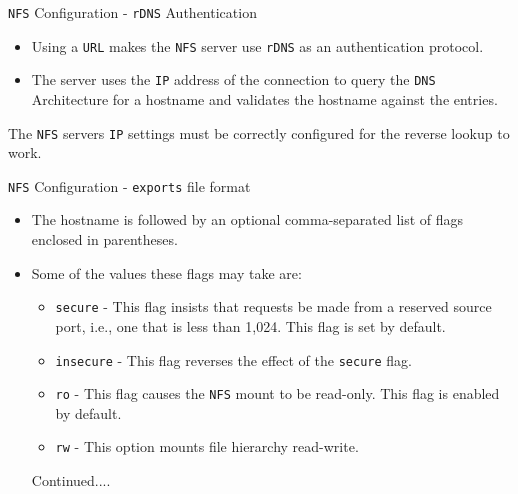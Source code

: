\documentclass[xcolor=table]{beamer}
\begin{document}
\begin{frame}{\texttt{NFS} Configuration - \texttt{rDNS} Authentication}
  \begin{itemize}
    \item Using a \texttt{URL} makes the \texttt{NFS} server use \texttt{rDNS} as an authentication protocol.
    \item The server uses the \texttt{IP} address of the connection to query the \texttt{DNS} Architecture for a hostname and validates the hostname against the entries.
  \end{itemize}
  \begin{tcolorbox}
    \begin{center}
      \scriptsize The \texttt{NFS} servers \texttt{IP} settings must be correctly configured for the reverse lookup to work.
    \end{center}
  \end{tcolorbox}
\end{frame}

\begin{frame}{\texttt{NFS} Configuration - \texttt{exports} file format}
  \begin{itemize}
    \item The hostname is followed by an optional comma-separated list of flags enclosed in parentheses. 
    \item Some of the values these flags may take are: 
      \begin{itemize}
        \item \texttt{secure} - This flag insists that requests be made from a reserved source port, i.e., one that is less than 1,024. This flag is set by default.
        \item \texttt{insecure} - This flag reverses the effect of the \texttt{secure} flag.
        \item \texttt{ro} - This flag causes the \texttt{NFS} mount to be read-only. This flag is enabled by default.
        \item \texttt{rw} - This option mounts file hierarchy read-write.
      \end{itemize}
      Continued....
  \end{itemize}
\end{frame}
\end{document}

